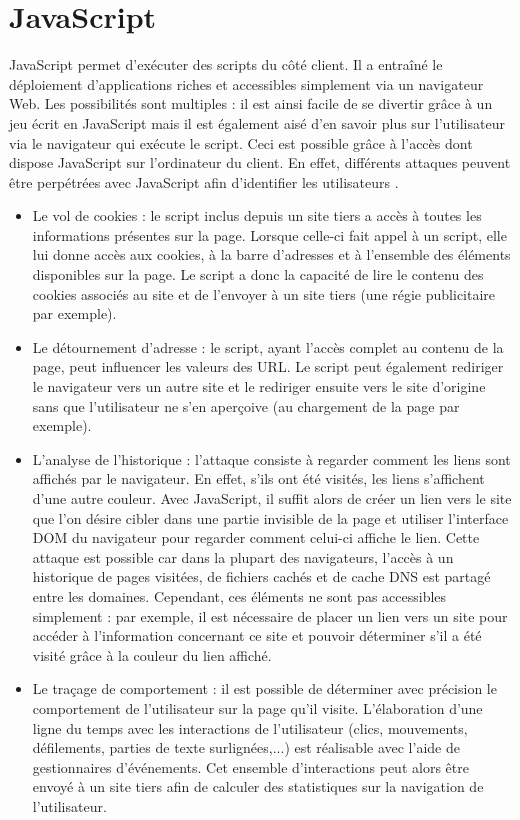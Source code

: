 \section{JavaScript}
JavaScript permet d'exécuter des scripts du côté client. Il a entraîné le déploiement d'applications riches et accessibles simplement via un navigateur Web. Les possibilités sont multiples : il est ainsi facile de se divertir grâce à un jeu écrit en JavaScript mais il est également aisé d'en savoir plus sur l'utilisateur via le navigateur qui exécute le script. Ceci est possible grâce à l'accès dont dispose JavaScript sur l'ordinateur du client. En effet, différents attaques peuvent être perpétrées avec JavaScript afin d'identifier les utilisateurs \cite{Jang:2010:ESP:1866307.1866339}.
\newline

\begin{itemize}
	\item Le vol de cookies : le script inclus depuis un site tiers a accès à toutes les informations présentes sur la page. Lorsque celle-ci fait appel à un script, elle lui donne accès aux cookies, à la barre d'adresses et à l'ensemble des éléments disponibles sur la page. Le script a donc la capacité de lire le contenu des cookies associés au site et de l'envoyer à un site tiers (une régie publicitaire par exemple).
	\item Le détournement d'adresse : le script, ayant l'accès complet au contenu de la page, peut influencer les valeurs des URL. Le script peut également rediriger le navigateur vers un autre site et le rediriger ensuite vers le site d'origine sans que l'utilisateur ne s'en aperçoive (au chargement de la page par exemple).
	\item L'analyse de l'historique : l'attaque consiste à regarder comment les liens sont affichés par le navigateur. En effet, s'ils ont été visités, les liens s'affichent d'une autre couleur. Avec JavaScript, il suffit alors de créer un lien vers le site que l'on désire cibler dans une partie invisible de la page et utiliser l'interface DOM du navigateur pour regarder comment celui-ci affiche le lien. Cette attaque est possible car dans la plupart des navigateurs, l'accès à un historique de pages visitées, de fichiers cachés et de cache DNS est partagé entre les domaines. Cependant, ces éléments ne sont pas accessibles simplement : par exemple, il est nécessaire de placer un lien vers un site pour accéder à l'information concernant ce site et pouvoir déterminer s'il a été visité grâce à la couleur du lien affiché.
	\item Le traçage de comportement : il est possible de déterminer avec précision le comportement de l'utilisateur sur la page qu'il visite. L'élaboration d'une ligne du temps avec les interactions de l'utilisateur (clics, mouvements, défilements, parties de texte surlignées,...) est réalisable avec l'aide de gestionnaires d'événements. Cet ensemble d'interactions peut alors être envoyé à un site tiers afin de calculer des statistiques sur la navigation de l'utilisateur.
	\newline
\end{itemize}

